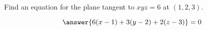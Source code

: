 \documentclass{ximera}
\author{David Guichard \and Neal Koblitz \and H. Jerome Keisler \and Albert Scheller \and Barry Balof \and Mike Wills \and Matthew Carr}
\begin{document}
\begin{exercise}




Find an equation for the plane tangent to $xyz=6$ at $(1,2,3)$.

\begin{prompt}
\[
\answer{6(x-1)+3(y-2)+2(z-3)}=0
\]
\end{prompt}


\end{exercise}
\end{document}
